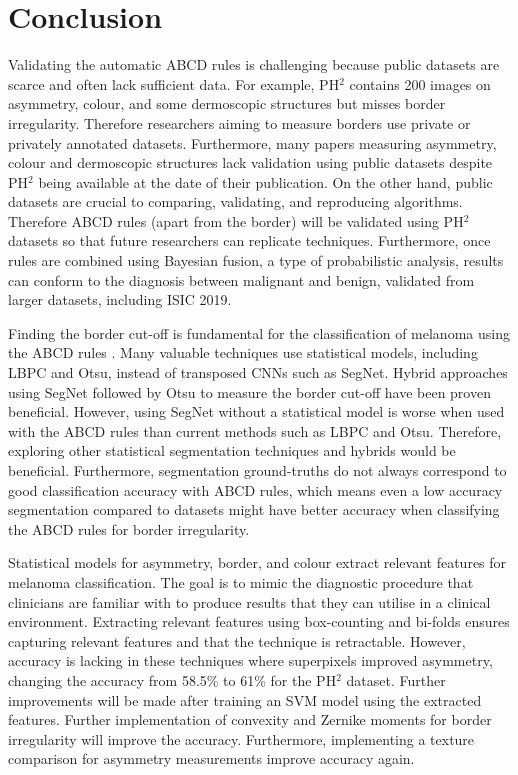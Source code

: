 \chapter{Conclusion}

Validating the automatic ABCD rules is challenging because public datasets are scarce and often lack sufficient data. For example, PH$^2$ contains 200 images on asymmetry, colour, and some dermoscopic structures but misses border irregularity. Therefore researchers aiming to measure borders use private or privately annotated datasets. Furthermore, many papers measuring asymmetry, colour and dermoscopic structures lack validation using public datasets despite PH$^2$ being available at the date of their publication. On the other hand, public datasets are crucial to comparing, validating, and reproducing algorithms. Therefore ABCD rules (apart from the border) will be validated using PH$^2$ datasets so that future researchers can replicate techniques. Furthermore, once rules are combined using Bayesian fusion, a type of probabilistic analysis, results can conform to the diagnosis between malignant and benign, validated from larger datasets, including ISIC 2019.

Finding the border cut-off is fundamental for the classification of melanoma using the ABCD rules \cite{Pereira2020}. Many valuable techniques use statistical models, including LBPC and Otsu, instead of transposed CNNs such as SegNet. Hybrid approaches using SegNet followed by Otsu to measure the border cut-off have been proven beneficial. However, using SegNet without a statistical model is worse when used with the ABCD rules than current methods such as LBPC and Otsu. Therefore, exploring other statistical segmentation techniques and hybrids would be beneficial. Furthermore, segmentation ground-truths do not always correspond to good classification accuracy with ABCD rules, which means even a low accuracy segmentation compared to datasets might have better accuracy when classifying the ABCD rules for border irregularity.

Statistical models for asymmetry, border, and colour extract relevant features for melanoma classification. The goal is to mimic the diagnostic procedure that clinicians are familiar with to produce results that they can utilise in a clinical environment. Extracting relevant features using box-counting and bi-folds ensures capturing relevant features and that the technique is retractable. However, accuracy is lacking in these techniques where superpixels improved asymmetry, changing the accuracy from 58.5\% to 61\% for the PH$^2$ dataset. Further improvements will be made after training an SVM model using the extracted features. Further implementation of convexity and Zernike moments for border irregularity will improve the accuracy. Furthermore, implementing a texture comparison for asymmetry measurements improve accuracy again.

